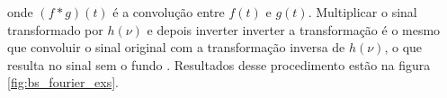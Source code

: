 \documentclass[a4paper,12pt,oneside]{book}
\DeclareMathOperator{\sinc}{sinc}
\DeclareMathOperator{\rect}{rect}
\begin{document}
\par onde $(f * g)(t)$ é a convolução entre $f(t)$ e $g(t)$. Multiplicar o sinal transformado por $h(\nu)$ e depois inverter inverter a transformação é o mesmo que convoluir o sinal original com a transformação inversa de $h(\nu)$, o que resulta no sinal sem o fundo \cite{josh_bradt, GET}. Resultados desse procedimento estão na figura \ref{fig:bs_fourier_exs}.


%
\end{document}
